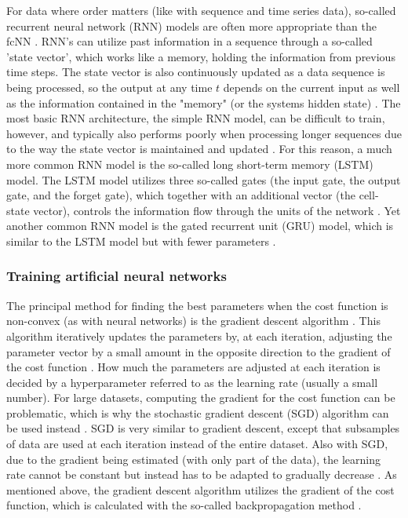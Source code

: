 For data where order matters (like with sequence and time series data), so-called recurrent neural network (RNN) models are often more appropriate than the fcNN \cite{LeCun2015}. RNN's can utilize past information in a sequence through a so-called 'state vector', which works like a memory, holding the information from previous time steps. The state vector is also continuously updated as a data sequence is being processed, so the output at any time $t$ depends on the current input as well as the information contained in the "memory" (or the systems hidden state) \cite{LeCun2015}. The most basic RNN architecture, the simple RNN model, can be difficult to train, however, and typically also performs poorly when processing longer sequences due to the way the state vector is maintained and updated \cite{LeCun2015}. For this reason, a much more common RNN model is the so-called long short-term memory (LSTM) model. The LSTM model utilizes three so-called gates (the input gate, the output gate, and the forget gate), which together with an additional vector (the cell-state vector), controls the information flow through the units of the network \cite{LeCun2015}. Yet another common RNN model is the gated recurrent unit (GRU) model, which is similar to the LSTM model but with fewer parameters \cite{Chollet2017}. 

\subsubsection{Training artificial neural networks}
The principal method for finding the best parameters when the cost function is non-convex (as with neural networks) is the gradient descent algorithm \cite{smlbook}. This algorithm iteratively updates the parameters by, at each iteration, adjusting the parameter vector by a small amount in the opposite direction to the gradient of the cost function \cite{smlbook}. How much the parameters are adjusted at each iteration is decided by a hyperparameter referred to as the learning rate (usually a small number). For large datasets, computing the gradient for the cost function can be problematic, which is why the stochastic gradient descent (SGD) algorithm can be used instead \cite{smlbook}. SGD is very similar to gradient descent, except that subsamples of data are used at each iteration instead of the entire dataset. Also with SGD, due to the gradient being estimated (with only part of the data), the learning rate cannot be constant but instead has to be adapted to gradually decrease \cite{smlbook}. As mentioned above, the gradient descent algorithm utilizes the gradient of the cost function, which is calculated with the so-called backpropagation method \cite{smlbook}. 

